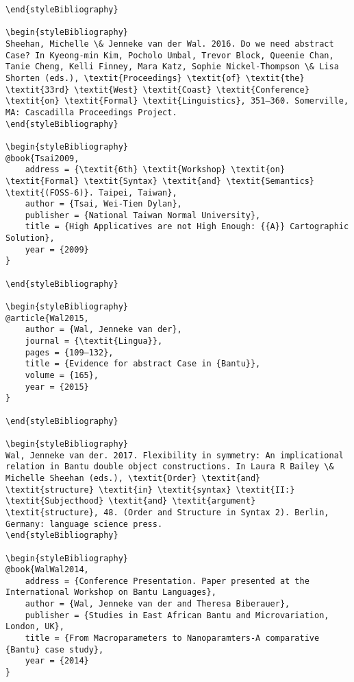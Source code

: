 \documentclass[output=paper,modfonts,nonflat]{langsci/langscibook}
\begin{document}
\begin{verbatim}
\end{styleBibliography}

\begin{styleBibliography}
Sheehan, Michelle \& Jenneke van der Wal. 2016. Do we need abstract Case? In Kyeong-min Kim, Pocholo Umbal, Trevor Block, Queenie Chan, Tanie Cheng, Kelli Finney, Mara Katz, Sophie Nickel-Thompson \& Lisa Shorten (eds.), \textit{Proceedings} \textit{of} \textit{the} \textit{33rd} \textit{West} \textit{Coast} \textit{Conference} \textit{on} \textit{Formal} \textit{Linguistics}, 351–360. Somerville, MA: Cascadilla Proceedings Project.
\end{styleBibliography}

\begin{styleBibliography}
@book{Tsai2009,
	address = {\textit{6th} \textit{Workshop} \textit{on} \textit{Formal} \textit{Syntax} \textit{and} \textit{Semantics} \textit{(FOSS-6)}. Taipei, Taiwan},
	author = {Tsai, Wei-Tien Dylan},
	publisher = {National Taiwan Normal University},
	title = {High Applicatives are not High Enough: {{A}} Cartographic Solution},
	year = {2009}
}

\end{styleBibliography}

\begin{styleBibliography}
@article{Wal2015,
	author = {Wal, Jenneke van der},
	journal = {\textit{Lingua}},
	pages = {109–132},
	title = {Evidence for abstract Case in {Bantu}},
	volume = {165},
	year = {2015}
}

\end{styleBibliography}

\begin{styleBibliography}
Wal, Jenneke van der. 2017. Flexibility in symmetry: An implicational relation in Bantu double object constructions. In Laura R Bailey \& Michelle Sheehan (eds.), \textit{Order} \textit{and} \textit{structure} \textit{in} \textit{syntax} \textit{II:} \textit{Subjecthood} \textit{and} \textit{argument} \textit{structure}, 48. (Order and Structure in Syntax 2). Berlin, Germany: language science press.
\end{styleBibliography}

\begin{styleBibliography}
@book{WalWal2014,
	address = {Conference Presentation. Paper presented at the International Workshop on Bantu Languages},
	author = {Wal, Jenneke van der and Theresa Biberauer},
	publisher = {Studies in East African Bantu and Microvariation, London, UK},
	title = {From Macroparameters to Nanoparamters-A comparative {Bantu} case study},
	year = {2014}
}


\end{verbatim}
\end{document}
